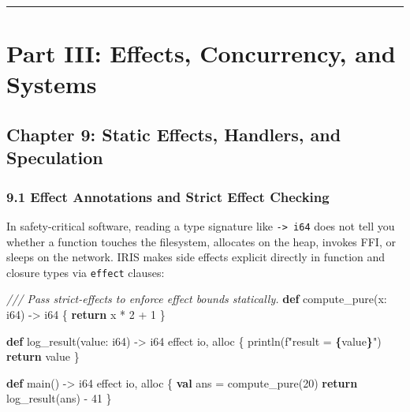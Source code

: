 \documentclass[
  english,
  oneside]{book}
\newenvironment{Shaded}{\begin{snugshade}}{\end{snugshade}}
\newcommand{\CommentTok}[1]{\textcolor[rgb]{0.42,0.60,0.33}{\textit{#1}}}
\newcommand{\ControlFlowTok}[1]{\textcolor[rgb]{0.77,0.53,0.75}{\textbf{#1}}}
\newcommand{\DataTypeTok}[1]{\textcolor[rgb]{0.31,0.79,0.69}{#1}}
\newcommand{\DecValTok}[1]{\textcolor[rgb]{0.71,0.81,0.66}{#1}}
\newcommand{\KeywordTok}[1]{\textcolor[rgb]{0.34,0.61,0.84}{\textbf{#1}}}
\newcommand{\NormalTok}[1]{\textcolor[rgb]{0.83,0.83,0.83}{#1}}
\newcommand{\OperatorTok}[1]{\textcolor[rgb]{0.83,0.83,0.83}{#1}}
\newcommand{\StringTok}[1]{\textcolor[rgb]{0.81,0.57,0.47}{#1}}
\begin{document}
\begin{center}\rule{0.5\linewidth}{0.5pt}\end{center}

\part{Part III: Effects, Concurrency, and
Systems}\label{part-iii-effects-concurrency-and-systems}

\chapter{Chapter 9: Static Effects, Handlers, and
Speculation}\label{chapter-9-static-effects-handlers-and-speculation}

\section{9.1 Effect Annotations and Strict Effect
Checking}\label{effect-annotations-and-strict-effect-checking}

In safety-critical software, reading a type signature like
\texttt{-\textgreater{}\ i64} does not tell you whether a function
touches the filesystem, allocates on the heap, invokes FFI, or sleeps on
the network. IRIS makes side effects explicit directly in function and
closure types via \texttt{effect} clauses:

\begin{Shaded}
\begin{Highlighting}[]
\CommentTok{/// Pass \textasciigrave{}{-}{-}strict{-}effects\textasciigrave{} to enforce effect bounds statically.}
\KeywordTok{def}\NormalTok{ compute\_pure(x: }\DataTypeTok{i64}\NormalTok{) }\OperatorTok{{-}\textgreater{}} \DataTypeTok{i64}\NormalTok{ \{}
    \ControlFlowTok{return}\NormalTok{ x }\OperatorTok{*} \DecValTok{2} \OperatorTok{+} \DecValTok{1}
\NormalTok{\}}

\KeywordTok{def}\NormalTok{ log\_result(value: }\DataTypeTok{i64}\NormalTok{) }\OperatorTok{{-}\textgreater{}} \DataTypeTok{i64}\NormalTok{ effect io, alloc \{}
\NormalTok{    println(}\StringTok{f"result = }\ControlFlowTok{\{}\NormalTok{value}\ControlFlowTok{\}}\StringTok{"}\NormalTok{)}
    \ControlFlowTok{return}\NormalTok{ value}
\NormalTok{\}}

\KeywordTok{def}\NormalTok{ main() }\OperatorTok{{-}\textgreater{}} \DataTypeTok{i64}\NormalTok{ effect io, alloc \{}
    \KeywordTok{val}\NormalTok{ ans }\OperatorTok{=}\NormalTok{ compute\_pure(}\DecValTok{20}\NormalTok{)}
    \ControlFlowTok{return}\NormalTok{ log\_result(ans) }\OperatorTok{{-}} \DecValTok{41}
\NormalTok{\}}
\end{Highlighting}
\end{Shaded}
\end{document}
